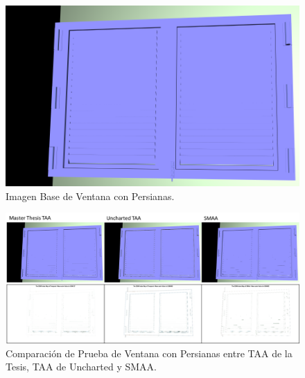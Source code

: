 \documentclass[pregrado]{tesis-usb} %
\begin{document}
\begin{figure}[!htb]
	\centering
	\includegraphics[scale=0.2]{images/results/window_blind_sobel_ground_truth.png}
	\caption{Imagen Base de Ventana con Persianas.}\label{fig:window_blind_truth}
\end{figure}

\begin{figure}[!htb]
	\centering
	\includegraphics[scale=0.8]{images/results/window_blind.png}
	\caption{Comparación de Prueba de Ventana con Persianas entre TAA de la Tesis, TAA de Uncharted y SMAA.}\label{fig:window_blind_render}
\end{figure}

\FloatBarrier
\end{document}
